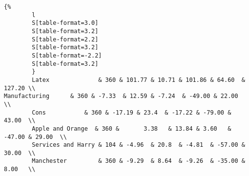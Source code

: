 \documentclass{article}
\begin{document}
\begin{verbatim}{%
		l
		S[table-format=3.0]
		S[table-format=3.2]
		S[table-format=2.2]
		S[table-format=3.2]
		S[table-format=-2.2]
		S[table-format=3.2]
		}
		Latex              & 360 & 101.77 & 10.71 & 101.86 & 64.60  & 127.20 \\
Manufacturing      & 360 & -7.33  & 12.59 & -7.24  & -49.00 & 22.00  \\
		Cons           & 360 & -17.19 & 23.4  & -17.22 & -79.00 & 43.00  \\
		Apple and Orange  & 360 &       3.38   & 13.84 & 3.60   & -47.00 & 29.00  \\
		Services and Harry & 104 & -4.96  & 20.8  & -4.81  & -57.00 & 30.00  \\
		Manchester         & 360 & -9.29  & 8.64  & -9.26  & -35.00 & 8.00   \\
\end{verbatim}
\end{document}
